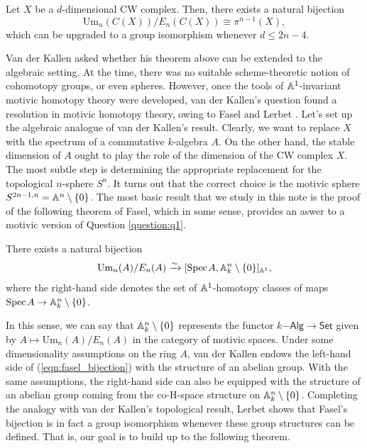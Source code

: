 \begin{theorem}\label{thm:vdk}
    Let $X$ be a $d$-dimensional CW complex. Then, there exists a natural bijection \[
\mathrm{Um}_n(C(X))/E_n(C(X)) \cong \pi^{n-1}(X),
\]
which can be upgraded to a group isomorphism whenever $d \leq 2n-4$.
\end{theorem}

Van der Kallen asked whether his theorem above can be extended to the algebraic setting. At the time, there was no suitable scheme-theoretic notion of cohomotopy groups, or even spheres. However, once the tools of $\mathbb{A}^1$-invariant motivic homotopy theory were developed, van der Kallen's question found a resolution in motivic homotopy theory, owing to Fasel \cite{Fasel_2010} and Lerbet \cite{LERBET2024109415}. Let's set up the algebraic analogue of van der Kallen's result. Clearly, we want to replace $X$ with the spectrum of a commutative $k$-algebra $A$. On the other hand, the stable dimension of $A$ ought to play the role of the dimension of the CW complex $X$. The most subtle step is determining the appropriate replacement for the topological $n$-sphere $S^n$. It turns out that the correct choice is the motivic sphere $S^{2n-1,n} = \mathbb{A}^n \setminus \{0\}$. The most basic result that we study in this note is the proof of the following theorem of Fasel, which in some sense, provides an aswer to a motivic version of Question \ref{question:q1}.

\begin{theorem}[Fasel, 2010]\label{thm:fasel}
    There exists a natural bijection
    \begin{align}\label{eqn:fasel_bijection}\mathrm{Um}_n(A)/E_n(A) \xrightarrow{\sim} [\text{Spec}\hspace{0.1em} A, \mathbb{A}^n_k\setminus \{0\}]_{\mathbb{A}^1},\end{align} 
    where the right-hand side denotes the set of $\mathbb{A}^1$-homotopy classes of maps $\text{Spec}\hspace{0.1em} A \to \mathbb{A}^n_k \setminus\{0\}$.
\end{theorem}

In this sense, we can say that $\mathbb{A}^n_k \setminus\{0\}$ represents the functor $k\mathsf{-Alg} \to \mathsf{Set}$ given by $A \mapsto \mathrm{Um}_n(A)/E_n(A)$ in the category of motivic spaces. Under some dimensionality assumptions on the ring $A$, van der Kallen endows the left-hand side of (\ref{eqn:fasel_bijection}) with the structure of an abelian group. With the same assumptions, the right-hand side can also be equipped with the structure of an abelian group coming from the co-H-space structure on $\mathbb{A}_k^n\setminus\{0\}$. Completing the analogy with van der Kallen's topological result, Lerbet \cite{LERBET2024109415} shows that Fasel's bijection is in fact a group isomorphism whenever these group structures can be defined. That is, our goal is to build up to the following theorem.

